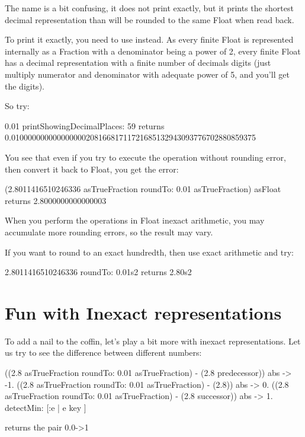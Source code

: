 \documentclass[a4paper,10pt,twoside]{book}
\begin{document}
The name  is a bit confusing, it does not print exactly,
but it prints the shortest decimal representation than will be rounded
to the same Float when read back.

To print it exactly, you need to use  instead.
As every finite Float is  represented internally as a Fraction with a
denominator being a power of 2, every finite Float has a decimal
representation with a finite number of decimals digits (just multiply
numerator and denominator with adequate power of 5, and you'll get the
digits).

So try:

\begin{code}{}
0.01 printShowingDecimalPlaces: 59
	returns 0.01000000000000000020816681711721685132943093776702880859375
\end{code}

You see that even if you try to execute the operation without rounding
error, then convert it back to Float, you get the error:

\begin{code}{}
(2.8011416510246336 asTrueFraction roundTo: 0.01 asTrueFraction) asFloat
	returns 2.8000000000000003
\end{code}

When you perform the  operations in Float inexact arithmetic,
you may accumulate more rounding errors, so the result may vary.

If you want to round to an exact hundredth, then use exact arithmetic and try:

\begin{code}{}
2.8011416510246336 roundTo: 0.01s2
	returns 2.80s2
\end{code}





\section{Fun with Inexact representations}
To add a nail to the coffin, let's play a bit more with inexact representations. Let us try to see the difference between different numbers: 

\begin{code}{}
{
((2.8 asTrueFraction roundTo: 0.01 asTrueFraction) - (2.8 predecessor)) abs -> -1.
((2.8 asTrueFraction roundTo: 0.01 asTrueFraction) - (2.8)) abs -> 0.
((2.8 asTrueFraction roundTo: 0.01 asTrueFraction) - (2.8 successor)) abs -> 1.
} detectMin: [:e | e key ]

returns the pair
	0.0->1
\end{code}
\end{document}
